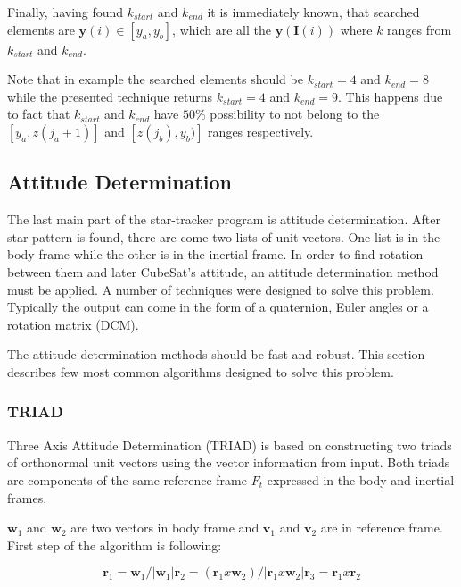 \documentclass[12pt,a4paper,oneside]{article}
\begin{document}
Finally, having found $k_{start}$ and $k_{end}$ it is immediately known, that searched elements are $\bm{y}(i) \in [y_a, y_b]$, which are all the $\bm{y}(\bm{I}(i))$ where $k$ ranges from $k_{start}$ and $k_{end}$.

Note that in example the searched elements should be $k_{start} = 4$ and $k_{end} = 8$ while the presented technique returns $k_{start} = 4$ and $k_{end} = 9$. This happens due to fact that $k_{start}$ and $k_{end}$ have $50\%$ possibility to not belong to the $[y_a, z(j_a +1)]$ and $[z(j_b), y_b)]$ ranges respectively.

\subsection{Attitude Determination}

The last main part of the star-tracker program is attitude determination. After star pattern is found, there are come two lists of unit vectors. One list is in the body frame while the other is in the inertial frame. In order to find rotation between them and later CubeSat's attitude, an attitude determination method must be applied. A number of techniques were designed to solve this problem. Typically the output can come in the form of a quaternion, Euler angles or a rotation matrix (DCM).

The attitude determination methods should be fast and robust. This section describes few most common algorithms designed to solve this problem.


\subsubsection{TRIAD}

Three Axis Attitude Determination (TRIAD) is based on constructing two triads of orthonormal unit vectors using the vector information from input. Both triads are components of the same reference frame $F_t$ expressed in the body and inertial frames\cite{hall2003spacecraft}.

$\bm{w}_1$ and $\bm{w}_2$ are two vectors in body frame and $\bm{v}_1$ and $\bm{v}_2$ are in reference frame. First step of the algorithm is following:

\begin{subequations}
\begin{equation}
\bm{r}_1 = \bm{w}_1/|\bm{w}_1|
\end{equation}
\begin{equation}
\bm{r}_2 = (\bm{r}_1 x \bm{w}_2) /|\bm{r}_1 x \bm{w}_2|
\end{equation}
\begin{equation}
\bm{r}_3 = \bm{r}_1 x \bm{r}_2
\end{equation}
\end{subequations}
\end{document}
